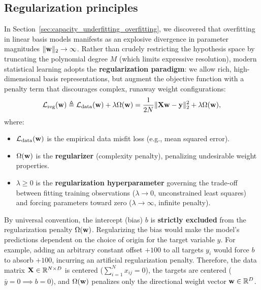 \subsection{Regularization principles}
\label{sec:regularization_paradigm}

In Section~\ref{sec:capacity_underfitting_overfitting}, we discovered that overfitting in linear basis models manifests as an explosive divergence in parameter magnitudes $\|\mathbf{w}\|_2 \to \infty$. Rather than crudely restricting the hypothesis space by truncating the polynomial degree $M$ (which limits expressive resolution), modern statistical learning adopts the \textbf{regularization paradigm}: we allow rich, high-dimensional basis representations, but augment the objective function with a penalty term that discourages complex, runaway weight configurations:
\begin{equation}
\mathcal{L}_{\text{reg}}(\mathbf{w}) \triangleq \mathcal{L}_{\text{data}}(\mathbf{w}) + \lambda \Omega(\mathbf{w}) = \frac{1}{2N} \|\mathbf{X}\mathbf{w} - \mathbf{y}\|_2^2 + \lambda \Omega(\mathbf{w}),
\label{eq:regularized_objective_general}
\end{equation}
where:
\begin{itemize}[noitemsep,topsep=2pt,parsep=0pt,partopsep=0pt]
  \item $\mathcal{L}_{\text{data}}(\mathbf{w})$ is the empirical data misfit loss (e.g., mean squared error).
  \item $\Omega(\mathbf{w})$ is the \textbf{regularizer} (complexity penalty), penalizing undesirable weight properties.
  \item $\lambda \ge 0$ is the \textbf{regularization hyperparameter} governing the trade-off between fitting training observations ($\lambda \to 0$, unconstrained least squares) and forcing parameters toward zero ($\lambda \to \infty$, infinite penalty).
\end{itemize}

\begin{remark}
By universal convention, the intercept (bias) $b$ is \textbf{strictly excluded} from the regularization penalty $\Omega(\mathbf{w})$. Regularizing the bias would make the model's predictions dependent on the choice of origin for the target variable $y$. For example, adding an arbitrary constant offset $+100$ to all targets $y_i$ would force $b$ to absorb $+100$, incurring an artificial regularization penalty. Therefore, the data matrix $\mathbf{X} \in \mathbb{R}^{N \times D}$ is centered ($\sum_{i=1}^N x_{ij} = 0$), the targets are centered ($\bar{y} = 0 \implies b = 0$), and $\Omega(\mathbf{w})$ penalizes only the directional weight vector $\mathbf{w} \in \mathbb{R}^D$.
\end{remark}

